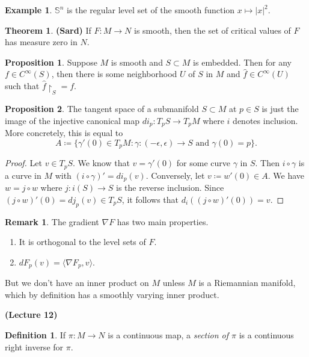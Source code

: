 \documentclass[10pt,letterpaper,cm]{nupset}
\theoremstyle{definition}
\newtheorem*{definition}{Definition}
\newtheorem{exmp}{Example}
\newtheorem{remark}{Remark}
\newtheorem{theorem}{Theorem}
\newtheorem{prop}{Proposition}
\renewcommand{\S}{\mathbb S}
\newcommand{\1}{\mathbf{1}}
\newcommand{\0}{\vec 0}
\begin{document}
\begin{exmp}
$\S^n$ is the regular level set of the smooth function $x\mapsto |x|^2$.
\end{exmp}

\begin{theorem}{\textbf{(Sard)}}
If $F: M \to N$ is smooth, then the set of critical values of $F$ has measure zero in $N$.
\end{theorem}

\begin{prop}
Suppose $M$ is smooth and $S\subset M$ is embedded. Then for any $f \in C^{\infty}(S)$, then there is some neighborhood $U$ of $S$ in $M$ and $\hat{f} \in C^{\infty}(U)$ such that $\hat{f}\restriction_S = f$.
\end{prop}
\begin{prop}
The tangent space of a submanifold $S \subset M$ at $p\in S$ is just the image of the injective canonical map $di_p : T_pS \to T_p M$ where $i$ denotes inclusion. More concretely, this is equal to $$A\coloneqq \{ \gamma ' (0) \in T_pM : \gamma : (-\epsilon, \epsilon) \to S \text{ and } \gamma(0) =p\}.$$
\end{prop}
\begin{proof}
Let $v \in T_pS$. We know that $v= \gamma'(0)$ for some curve $\gamma$ in $S$. Then $i \circ \gamma$ is a curve in $M$ with $(i \circ \gamma)'= di_p(v)$. Conversely, let $v\coloneqq  w'(0) \in A$. We have $w = j \circ w$ where $j: i(S) \to S$ is the reverse inclusion. Since $(j \circ w)'(0) = dj_p(v) \in T_pS$, it follows that $d_i((j \circ w)'(0)) = v$.
\end{proof}


\begin{remark}
The gradient $\nabla F$ has two main properties.
\begin{enumerate}
\item It is orthogonal to the level sets of $F$.
\item $dF_p(v) = \langle \nabla F_p, v\rangle$.
\end{enumerate}
But we don't have an inner product on $M$ unless $M$ is a Riemannian manifold, which by definition has a smoothly varying inner product. 
\end{remark}

\begin{center}
{\textbf{(Lecture 12)}} 
\end{center}

\begin{definition}
If $\pi : M \to N$ is a continuous map, a \textit{section of $\pi$} is a continuous right inverse for $\pi$.
\end{definition}
\end{document}
